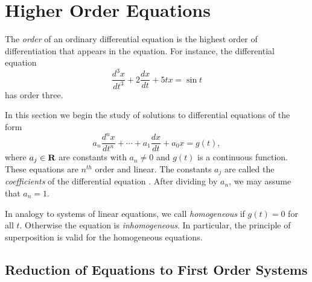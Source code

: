 \documentclass{ximera}
\begin{document}
\section{Higher Order Equations}
\label{sec:HighOrder}

The {\em order\/} of an ordinary differential equation is the highest 
order of differentiation that appears in the equation.  For instance, 
the differential equation  
\[
\frac{d^3x}{dt^3} + 2\frac{dx}{dt}+ 5tx = \sin t
\]
has order three. 

In this section we begin the study of solutions to differential equations 
of the form
\begin{equation}  \label{eq:nconst}
a_n\frac{d^nx}{dt^n} + \cdots + a_1\frac{dx}{dt}+a_0x = g(t),
\end{equation}
where $a_j\in\mbox{$\bf{R}$}$ are constants with $a_n\neq 0$ and $g(t)$ is a 
continuous function. These equations are $n^{th}$ order and linear. 
The constants $a_j$ are called the 
{\em coefficients\/} of the 
differential equation .  After dividing  by 
$a_n$, we may assume that $a_n=1$.  

In analogy to systems of linear equations, we call  
{\em homogeneous\/} if $g(t)=0$ for all $t$.  Otherwise the equation is 
{\em inhomogeneous}.   In particular, the principle of superposition is 
valid for the homogeneous equations.    

\subsection*{Reduction of Equations to First Order Systems}
\end{document}
